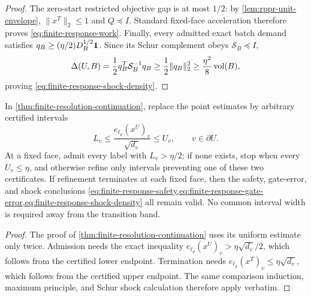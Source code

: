 \begin{proof}
The zero-start restricted objective gap is at most $1/2$: by
\cref{lem:rppr-unit-envelope}, $\|x^T\|_2\leq1$ and $Q\preceq I$.
Standard fixed-face acceleration therefore proves
\cref{eq:finite-response-work}.  Finally, every admitted exact batch demand
satisfies $q_B\geq(\eta/2)D_B^{1/2}\mathbf{1}$.  Since its Schur complement obeys
$\mathcal S_B\preceq I$,
\begin{equation*}
 \Delta(U,B)=\frac12q_B^T\mathcal S_B^{-1}q_B
 \geq\frac12\|q_B\|_2^2
 \geq\frac{\eta^2}{8}\operatorname{vol}(B),
\end{equation*}
proving \cref{eq:finite-response-shock-density}.
\end{proof}

\begin{corollary}
\label{cor:finite-response-intervals}
In \cref{thm:finite-resolution-continuation}, replace the point estimates by
arbitrary certified intervals
\begin{equation}
 L_v\leq
 \frac{e_{\ell_\rho}(x^U)_v}{\sqrt{d_v}}
 \leq U_v,
 \qquad v\in\partial U.
 \label{eq:finite-response-intervals}
\end{equation}
At a fixed face, admit every label with $L_v>\eta/2$; if none exists, stop
when every $U_v\leq\eta$, and otherwise refine only intervals preventing one
of these two certificates.  If refinement terminates at each fixed face,
then the safety, gate-error, and shock conclusions
\cref{eq:finite-response-safety,eq:finite-response-gate-error,eq:finite-response-shock-density}
all remain valid.  No common interval width is required away from the
transition band.
\end{corollary}

\begin{proof}
The proof of \cref{thm:finite-resolution-continuation} uses its uniform
estimate only twice.  Admission needs the exact inequality
$e_{\ell_\rho}(x^U)_v>\eta\sqrt{d_v}/2$, which follows from the certified
lower endpoint.  Termination needs
$e_{\ell_\rho}(x^T)_v\leq\eta\sqrt{d_v}$, which follows from the certified
upper endpoint.  The same comparison induction, maximum principle, and Schur
shock calculation therefore apply verbatim.
\end{proof}
